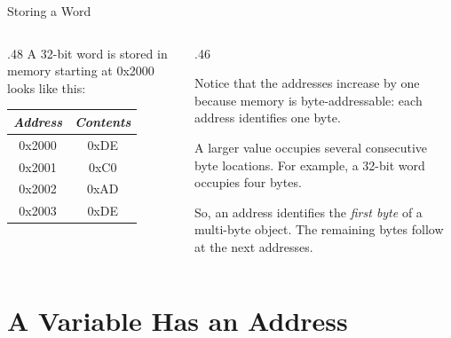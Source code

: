 \documentclass[9pt,aspectratio=169,xcolor=table]{beamer}
\begin{document}
\begin{frame}{Storing a Word}
	\leavevmode

	\begin{columns}[c]
		\begin{column}{.48\textwidth}
			{\small
				A 32-bit word is stored in memory starting at 0x2000 looks like this:			}

			\vspace{2mm}
			\begin{center}

				\begin{tabular}{|c|c|}
					\hline
					\textit{Address} & \textit{Contents} \\
					\hline
					0x2000 & 0xDE \\
					\hline
					0x2001 & 0xC0 \\
					\hline
					0x2002 & 0xAD \\
					\hline
					0x2003 & 0xDE \\
					\hline
				\end{tabular}

			\end{center}
		\end{column}

		\begin{column}{.46\textwidth}
			{\small
				Notice that the addresses increase by one because memory is
				\alert{byte-addressable}: each address identifies one byte.

				\vspace{3mm}

				A larger value occupies several consecutive byte locations.
				For example, a 32-bit word occupies four bytes.

				\vspace{3mm}

				So, an address identifies the \emph{first byte} of a
				multi-byte object. The remaining bytes follow at the
				next addresses.
			}
		\end{column}
	\end{columns}
\end{frame}

\section{A Variable Has an Address}
\end{document}
